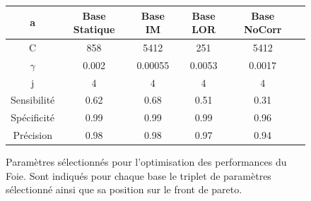 \begin{figure}[h!]
\label{fig:paramsModFoie}
		\begin{tabular}{c| c c c c c}
  \hline
  a	& Base Statique	& Base IM	& Base LOR	& Base NoCorr	\\
  \hline
 C 	& 858		& 5412		& 251		& 5412		\\
\hline
$\gamma$& 0.002		& 0.00055	& 0.0053	& 0.0017	\\
\hline
j	& 4		& 4		& 4		& 4		\\
\hline
\hline
Sensibilité& 0.62	& 0.68		& 0.51		& 0.31	\\
\hline
Spécificité& 0.99	& 0.99		& 0.99		& 0.96		\\
\hline
Précision& 0.98		& 0.98		& 0.97		& 0.94		\\
\hline
 		\end{tabular}

\caption{Paramètres sélectionnés pour l'optimisation des performances du Foie. Sont indiqués pour chaque base le triplet de paramètres sélectionné ainsi que sa position sur le front de pareto.}
\end{figure}
% 
% 
% 
